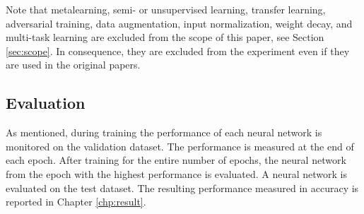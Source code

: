 Note that metalearning, semi- or unsupervised learning, transfer learning, adversarial training, data augmentation, input normalization, weight decay, and multi-task learning are excluded from the scope of this paper,  see Section \ref{sec:scope}. In consequence, they are excluded from the experiment even if they are used in the original papers.

\subsection{Evaluation}
As mentioned, during training the performance of each neural network is monitored on the validation dataset. The performance is measured at the end of each epoch. After training for the entire number of epochs, the neural network from the epoch with the highest performance is evaluated. A neural network is evaluated on the test dataset. The resulting performance measured in accuracy is reported in Chapter \ref{chp:result}.
